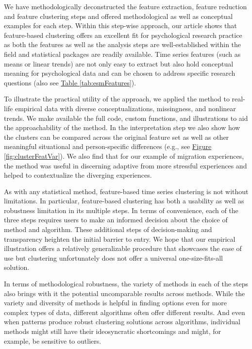 \documentclass[man, 12pt, a4paper, mask]{apa7}
\theoremstyle{break}
\theoremstyle{plain}
\newcommand{\fgrref}[2][]{\hyperref[#2]{Figure \ref*{#2}#1}}
\newcommand{\tblref}[2][]{\hyperref[#2]{Table \ref*{#2}#1}}
\begin{document}
We have methodologically deconstructed the feature extraction, feature reduction and feature clustering steps and offered methodological as well as conceptual examples for each step. Within this step-wise approach, our article shows that feature-based clustering offers an excellent fit for psychological research practice as both the features as well as the analysis steps are well-established within the field and statistical packages are readily available. Time series features (such as means or linear trends) are not only easy to extract but also hold conceptual meaning for psychological data and can be chosen to address specific research questions (also see \tblref{tab:esmFeatures}). 

To illustrate the practical utility of the approach, we applied the method to real-life empirical data with diverse conceptualizations, missingness, and nonlinear trends. We make available the full code, custom functions, and illustrations to aid the approachability of the method. In the interpretation step we also show how the clusters can be compared across the original feature set as well as other meaningful situational and person-specific differences (e.g., see \fgrref{fig:clusterFeatVar}). We also find that for our example of migration experiences, the method was useful in discerning adaptive from more stressful experiences and helped to contextualize the diverging experiences.

As with any statistical method, feature-based time series clustering is not without limitations. 
In particular, feature-based clustering has both a usability as well as robustness limitation in its multiple steps. In terms of convenience, each of the three steps requires users to make an informed decision about the choice of method and algorithm. These additional steps of decision-making and transparency heighten the initial barrier to entry. We hope that our empirical illustration offers a relatively generalizable procedure that showcases the ease of use but clustering unfortunately does not offer a universal one-size-fits-all solution. 

In terms of methodological robustness, the variety of methods in each of the steps also brings with it the potential uncomparable results across methods. While the variety and diversity of methods is helpful in finding options even for more complex types of data, different algorithms often offer different results. And even when patterns produce robust clustering solutions across algorithms, individual methods might still have their ideosyncratic shortcomings and might, for example, be sensitive to outliers. 
\end{document}
